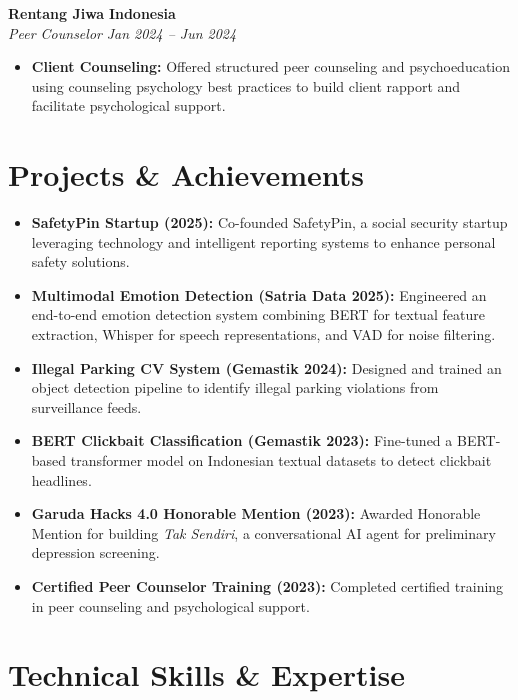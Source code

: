 \documentclass[letterpaper,10pt]{article}
\begin{document}
\noindent \textbf{\large Rentang Jiwa} \hfill \textbf{Indonesia} \\
\textit{Peer Counselor} \hfill \textit{Jan 2024 -- Jun 2024}
\begin{itemize}
    \item \textbf{Client Counseling:} Offered structured peer counseling and psychoeducation using counseling psychology best practices to build client rapport and facilitate psychological support.
\end{itemize}
\vspace{4pt}

\section{Projects \& Achievements}
\vspace{2pt}

\begin{itemize}[leftmargin=0.2in, itemsep=1.2pt]
    \item \textbf{SafetyPin Startup (2025):} Co-founded SafetyPin, a social security startup leveraging technology and intelligent reporting systems to enhance personal safety solutions.
    \item \textbf{Multimodal Emotion Detection (Satria Data 2025):} Engineered an end-to-end emotion detection system combining BERT for textual feature extraction, Whisper for speech representations, and VAD for noise filtering.
    \item \textbf{Illegal Parking CV System (Gemastik 2024):} Designed and trained an object detection pipeline to identify illegal parking violations from surveillance feeds.
    \item \textbf{BERT Clickbait Classification (Gemastik 2023):} Fine-tuned a BERT-based transformer model on Indonesian textual datasets to detect clickbait headlines.
    \item \textbf{Garuda Hacks 4.0 Honorable Mention (2023):} Awarded Honorable Mention for building \textit{Tak Sendiri}, a conversational AI agent for preliminary depression screening.
    \item \textbf{Certified Peer Counselor Training (2023):} Completed certified training in peer counseling and psychological support.
\end{itemize}
\vspace{4pt}

\section{Technical Skills \& Expertise}
\vspace{2pt}
\end{document}

